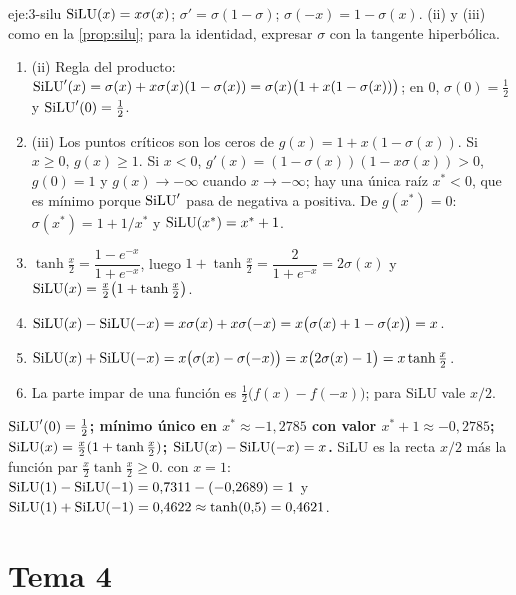 \begin{solucion}{eje:3-silu}
\datos $\operatorname{SiLU}(x)=x\sigma(x)$; $\sigma'=\sigma(1-\sigma)$; $\sigma(-x)=1-\sigma(x)$.
\planteamiento (ii) y (iii) como en la \cref{prop:silu}; para la identidad, expresar $\sigma$ con la tangente hiperbólica.
\pasos
\begin{enumerate}[label=\arabic*.]
  \item (ii) Regla del producto: $\operatorname{SiLU}'(x)=\sigma(x)+x\sigma(x)(1-\sigma(x))=\sigma(x)\bigl(1+x(1-\sigma(x))\bigr)$; en $0$, $\sigma(0)=\tfrac12$ y $\operatorname{SiLU}'(0)=\tfrac12$.
  \item (iii) Los puntos críticos son los ceros de $g(x)=1+x(1-\sigma(x))$. Si $x\ge 0$, $g(x)\ge 1$. Si $x<0$, $g'(x)=(1-\sigma(x))(1-x\sigma(x))>0$, $g(0)=1$ y $g(x)\to-\infty$ cuando $x\to-\infty$; hay una única raíz $x^{*}<0$, que es mínimo porque $\operatorname{SiLU}'$ pasa de negativa a positiva. De $g(x^{*})=0$: $\sigma(x^{*})=1+1/x^{*}$ y $\operatorname{SiLU}(x^{*})=x^{*}+1$.
  \item $\tanh\frac{x}{2}=\dfrac{1-e^{-x}}{1+e^{-x}}$, luego $1+\tanh\frac x2=\dfrac{2}{1+e^{-x}}=2\sigma(x)$ y $\operatorname{SiLU}(x)=\frac{x}{2}\bigl(1+\tanh\frac x2\bigr)$.
  \item $\operatorname{SiLU}(x)-\operatorname{SiLU}(-x)=x\sigma(x)+x\sigma(-x)=x\bigl(\sigma(x)+1-\sigma(x)\bigr)=x$.
  \item $\operatorname{SiLU}(x)+\operatorname{SiLU}(-x)=x\bigl(\sigma(x)-\sigma(-x)\bigr)=x\bigl(2\sigma(x)-1\bigr)=x\tanh\frac x2$.
  \item La parte impar de una función es $\frac12\bigl(f(x)-f(-x)\bigr)$; para SiLU vale $x/2$.
\end{enumerate}
\resultado \textbf{$\operatorname{SiLU}'(0)=\tfrac12$; mínimo único en $x^{*}\approx-1{,}2785$ con valor $x^{*}+1\approx-0{,}2785$; $\operatorname{SiLU}(x)=\frac x2(1+\tanh\frac x2)$; $\operatorname{SiLU}(x)-\operatorname{SiLU}(-x)=x$.} SiLU es la recta $x/2$ más la función par $\frac x2\tanh\frac x2\ge 0$.
\comprobacion con $x=1$: $\operatorname{SiLU}(1)-\operatorname{SiLU}(-1)=0{,}7311-(-0{,}2689)=1$ y $\operatorname{SiLU}(1)+\operatorname{SiLU}(-1)=0{,}4622\approx\tanh(0{,}5)=0{,}4621$.
\end{solucion}

\section{Tema 4}

